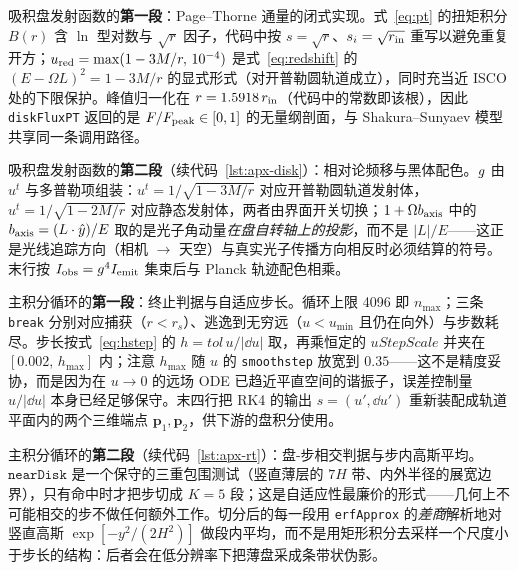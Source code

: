 \begin{listing}[t]
\caption{吸积盘发射函数的\textbf{第一段}：Page--Thorne 通量的闭式实现。式~\eqref{eq:pt} 的扭矩积分 $B(r)$ 含 $\ln$ 型对数与 $\sqrt{r}$ 因子，代码中按 $s=\sqrt{r}$、$s_i=\sqrt{r_{\rm in}}$ 重写以避免重复开方；$u_{\rm red} = \max(1-3M/r,\,10^{-4})$ 是式~\eqref{eq:redshift} 的 $(E-\Omega L)^2 = 1-3M/r$ 的显式形式（对开普勒圆轨道成立），同时充当近 ISCO 处的下限保护。峰值归一化在 $r = 1.5918\,r_{\rm in}$（代码中的常数即该根），因此 \texttt{diskFluxPT} 返回的是 $F/F_{\rm peak}\in[0,1]$ 的无量纲剖面，与 Shakura--Sunyaev 模型共享同一条调用路径。}
\label{lst:apx-disk}

\end{listing}

\begin{listing}[t]
\caption{吸积盘发射函数的\textbf{第二段}（续代码~\ref{lst:apx-disk}）：相对论频移与黑体配色。$\gfac$ 由 $u^t$ 与多普勒项组装：$u^t = 1/\sqrt{1-3M/r}$ 对应开普勒圆轨道发射体，$u^t = 1/\sqrt{1-2M/r}$ 对应静态发射体，两者由界面开关切换；$1+\Omega b_{\rm axis}$ 中的 $b_{\rm axis} = (L\cdot\hat{y})/E$ 取的是光子角动量\emph{在盘自转轴上的投影}，而不是 $|L|/E$——这正是光线追踪方向（相机 $\to$ 天空）与真实光子传播方向相反时必须结算的符号。末行按 $I_{\rm obs} = \gfac^{4} I_{\rm emit}$ 集束后与 Planck 轨迹配色相乘。}
\label{lst:apx-disk-b}

\end{listing}

\begin{listing}[t]
\caption{主积分循环的\textbf{第一段}：终止判据与自适应步长。循环上限 4096 即 $n_{\max}$；三条 \texttt{break} 分别对应捕获（$r<r_s$）、逃逸到无穷远（$u<u_{\min}$ 且仍在向外）与步数耗尽。步长按式~\eqref{eq:hstep} 的 $h = tol\,u/|\dd u|$ 取，再乘恒定的 $uStepScale$ 并夹在 $[0.002,\,h_{\max}]$ 内；注意 $h_{\max}$ 随 $u$ 的 \texttt{smoothstep} 放宽到 $0.35$——这不是精度妥协，而是因为在 $u\to0$ 的远场 ODE 已趋近平直空间的谐振子，误差控制量 $u/|\dd u|$ 本身已经足够保守。末四行把 RK4 的输出 $s=(u',\dd u')$ 重新装配成轨道平面内的两个三维端点 $\mathbf{p}_{1},\mathbf{p}_{2}$，供下游的盘积分使用。}
\label{lst:apx-rt}

\end{listing}

\begin{listing}[t]
\caption{主积分循环的\textbf{第二段}（续代码~\ref{lst:apx-rt}）：盘-步相交判据与步内高斯平均。$\texttt{nearDisk}$ 是一个保守的三重包围测试（竖直薄层的 $7H$ 带、内外半径的展宽边界），只有命中时才把步切成 $K=5$ 段；这是自适应性最廉价的形式——几何上不可能相交的步不做任何额外工作。切分后的每一段用 \texttt{erfApprox} 的\emph{差商}解析地对竖直高斯 $\exp[-y^2/(2H^2)]$ 做段内平均，而不是用矩形积分去采样一个尺度小于步长的结构：后者会在低分辨率下把薄盘采成条带状伪影。}
\label{lst:apx-rt-b}

\end{listing}

